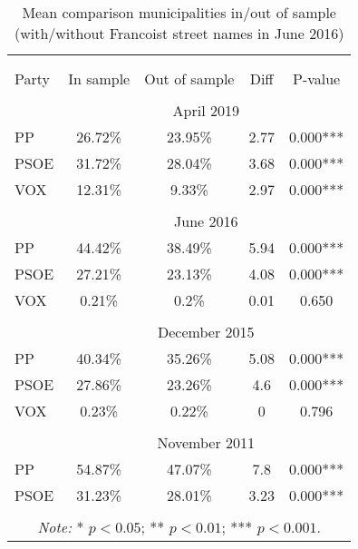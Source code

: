 \begin{table}[!htbp] \centering
\caption{Mean comparison municipalities in/out of sample (with/without Francoist street names in June 2016)}
\label{tab:ttest_sample}
\small
\begin{tabular}{lcccc}
\\[-1.8ex]\hline
\hline \\[-1.8ex]
\\[-1.8ex]
Party & In sample & Out of sample & Diff & P-value \\
\hline \\[-1.8ex]
& \multicolumn{4}{c}{April 2019}\\
PP & 26.72\% & 23.95\% & 2.77 & 0.000*** \\
PSOE & 31.72\% & 28.04\% & 3.68 & 0.000*** \\
VOX & 12.31\% & 9.33\% & 2.97 & 0.000*** \\
\hline \\[-1.8ex]
& \multicolumn{4}{c}{June 2016}\\
PP & 44.42\% & 38.49\% & 5.94 & 0.000*** \\
PSOE & 27.21\% & 23.13\% & 4.08 & 0.000*** \\
VOX & 0.21\% & 0.2\% & 0.01 & 0.650 \\
\hline \\[-1.8ex]
& \multicolumn{4}{c}{December 2015}\\
PP & 40.34\% & 35.26\% & 5.08 & 0.000*** \\
PSOE & 27.86\% & 23.26\% & 4.6 & 0.000*** \\
VOX & 0.23\% & 0.22\% & 0 & 0.796 \\
\hline \\[-1.8ex]
& \multicolumn{4}{c}{November 2011}\\
PP & 54.87\% & 47.07\% & 7.8 & 0.000*** \\
PSOE & 31.23\% & 28.01\% & 3.23 & 0.000*** \\
\hline
\hline \\[-1.8ex]
\multicolumn{5}{c}{\parbox[t]{0.65\textwidth}{\textit{Note:} * $p<0.05$; ** $p<0.01$; *** $p<0.001$.}}\\
\end{tabular}
\end{table}
